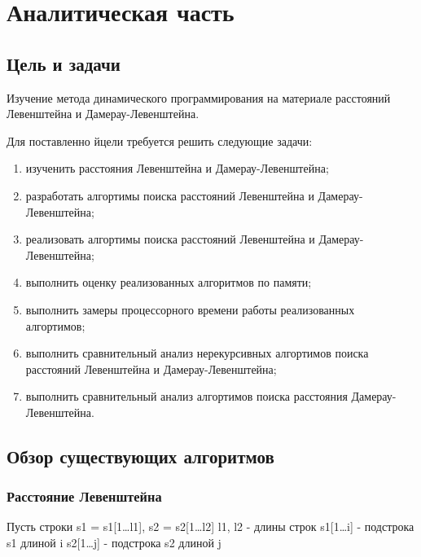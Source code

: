 \section{Аналитическая часть}

\subsection{Цель и задачи}

Изучение метода динамического программирования на материале расстояний Левенштейна и Дамерау-Левенштейна.

Для поставленно йцели требуется решить следующие задачи:

\begin{enumerate}[leftmargin=1.6\parindent]
	\item изученить расстояния Левенштейна и Дамерау-Левенштейна;
	\item разработать алгортимы поиска расстояний Левенштейна и Дамерау-Левенштейна;
	\item реализовать алгортимы поиска расстояний Левенштейна и Дамерау-Левенштейна;
	\item выполнить оценку реализованных алгоритмов по памяти;
	\item выполнить замеры процессорного времени работы реализованных алгортимов;
	\item выполнить сравнительный анализ нерекурсивных алгортимов поиска расстояний Левенштейна и Дамерау-Левенштейна;
	\item выполнить сравнительный анализ алгортимов поиска расстояния \newline Дамерау-Левенштейна.
\end{enumerate}
\pagebreak
\subsection{Обзор существующих алгоритмов}

\subsubsection{Расстояние Левенштейна}
Пусть строки s1 = s1[1\dots l1], s2 = s2[1\dots l2]\newline
l1, l2 - длины строк\newline
s1[1\dots i] - подстрока s1 длиной i\newline
s2[1\dots j] - подстрока s2 длиной j

